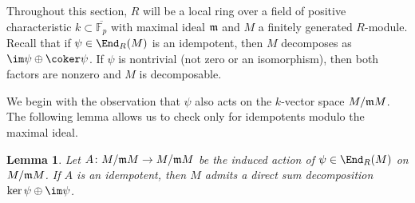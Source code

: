 \documentclass[12pt]{article}
\def\FF{\mathbb F}
\theoremstyle{theorem}
\numberwithin{thm}{section}
\newtheorem{lem}[thm]{Lemma}
\theoremstyle{definition}
\begin{document}
Throughout this section, $R$ will be a local ring over a field of positive characteristic $k \subset \overline{\FF_p}$ with maximal ideal $\mathfrak m$ and $M$ a finitely generated $R$-module. Recall that if $\psi\in\End_R(M)$ is an idempotent, then $M$ decomposes as $\im \psi \oplus \coker \psi$. If $\psi$ is nontrivial (not zero or an isomorphism), then both factors are nonzero and $M$ is decomposable.

We begin with the observation that $\psi$ also acts on the $k$-vector space $M/\mathfrak m M$. The following lemma allows us to check only for idempotents modulo the maximal ideal.

\begin{lem}\label{lem:idemp}
  Let $A\colon M/\mathfrak m M\to M/\mathfrak m M$ be the induced action of $\psi\in\End_R(M)$ on $M/\mathfrak m M$. If $A$ is an idempotent, then $M$ admits a direct sum decomposition $\ker\psi \oplus \im\psi$.
\end{lem}
\end{document}
